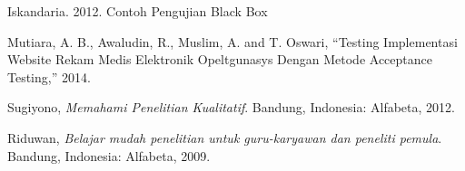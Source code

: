 \begin{thebibliography}{7}
Iskandaria. 2012. Contoh Pengujian Black Box

Mutiara, A. B., Awaludin, R., Muslim, A. and T. Oswari, “Testing Implementasi Website Rekam Medis Elektronik Opeltgunasys Dengan Metode Acceptance Testing,” 2014.

Sugiyono, \emph{Memahami Penelitian Kualitatif}. Bandung, Indonesia: Alfabeta, 2012.

Riduwan, \emph{Belajar mudah penelitian untuk guru-karyawan dan peneliti pemula}. Bandung, Indonesia: Alfabeta, 2009. 


\end{thebibliography}

